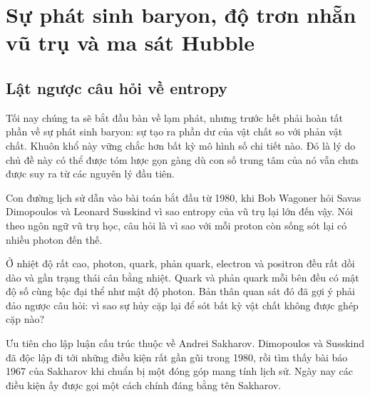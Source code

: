 \chapter{Sự phát sinh baryon, độ trơn nhẵn vũ trụ và ma sát Hubble}


\section{Lật ngược câu hỏi về entropy}

Tối nay chúng ta sẽ bắt đầu bàn về lạm phát, nhưng trước hết phải hoàn tất phần về sự phát sinh baryon: sự tạo ra phần dư của vật chất so với phản vật chất. Khuôn khổ này vững chắc hơn bất kỳ mô hình số chi tiết nào. Đó là lý do chủ đề này có thể được tóm lược gọn gàng dù con số trung tâm của nó vẫn chưa được suy ra từ các nguyên lý đầu tiên.

Con đường lịch sử dẫn vào bài toán bắt đầu từ 1980, khi Bob Wagoner hỏi Savas Dimopoulos và Leonard Susskind vì sao entropy của vũ trụ lại lớn đến vậy. Nói theo ngôn ngữ vũ trụ học, câu hỏi là vì sao với mỗi proton còn sống sót lại có nhiều photon đến thế.

Ở nhiệt độ rất cao, photon, quark, phản quark, electron và positron đều rất dồi dào và gần trạng thái cân bằng nhiệt. Quark và phản quark mỗi bên đều có mật độ số cùng bậc đại thể như mật độ photon. Bản thân quan sát đó đã gợi ý phải đảo ngược câu hỏi: vì sao sự hủy cặp lại để sót bất kỳ vật chất không được ghép cặp nào?

Ưu tiên cho lập luận cấu trúc thuộc về Andrei Sakharov. Dimopoulos và Susskind đã độc lập đi tới những điều kiện rất gần gũi trong 1980, rồi tìm thấy bài báo 1967 của Sakharov khi chuẩn bị một đóng góp mang tính lịch sử. Ngày nay các điều kiện ấy được gọi một cách chính đáng bằng tên Sakharov.

